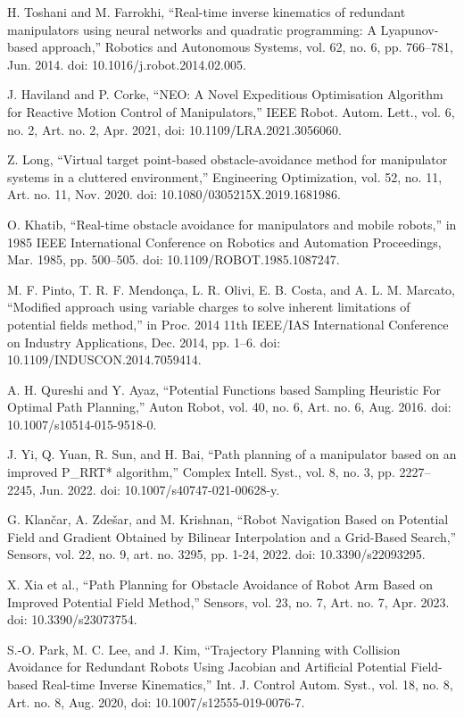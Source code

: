 \documentclass[letterpaper, 10 pt, conference]{ieeeconf}  %
\begin{document}
\begin{thebibliography}{99}
 H. Toshani and M. Farrokhi, “Real-time inverse kinematics of redundant manipulators using neural networks and quadratic programming: A Lyapunov-based approach,” Robotics and Autonomous Systems, vol. 62, no. 6, pp. 766–781, Jun. 2014. doi: 10.1016/j.robot.2014.02.005.

 J. Haviland and P. Corke, “NEO: A Novel Expeditious Optimisation Algorithm for Reactive Motion Control of Manipulators,” IEEE Robot. Autom. Lett., vol. 6, no. 2, Art. no. 2, Apr. 2021, doi: 10.1109/LRA.2021.3056060.

 Z. Long, “Virtual target point-based obstacle-avoidance method for manipulator systems in a cluttered environment,” Engineering Optimization, vol. 52, no. 11, Art. no. 11, Nov. 2020. doi: 10.1080/0305215X.2019.1681986.

 O. Khatib, “Real-time obstacle avoidance for manipulators and mobile robots,” in 1985 IEEE International Conference on Robotics and Automation Proceedings, Mar. 1985, pp. 500–505. doi: 10.1109/ROBOT.1985.1087247.

 M. F. Pinto, T. R. F. Mendonça, L. R. Olivi, E. B. Costa, and A. L. M. Marcato, “Modified approach using variable charges to solve inherent limitations of potential fields method,” in Proc. 2014 11th IEEE/IAS International Conference on Industry Applications, Dec. 2014, pp. 1–6. doi: 10.1109/INDUSCON.2014.7059414.

 A. H. Qureshi and Y. Ayaz, “Potential Functions based Sampling Heuristic For Optimal Path Planning,” Auton Robot, vol. 40, no. 6, Art. no. 6, Aug. 2016. doi: 10.1007/s10514-015-9518-0.

 J. Yi, Q. Yuan, R. Sun, and H. Bai, “Path planning of a manipulator based on an improved P\_RRT* algorithm,” Complex Intell. Syst., vol. 8, no. 3, pp. 2227–2245, Jun. 2022. doi: 10.1007/s40747-021-00628-y.

G. Klančar, A. Zdešar, and M. Krishnan, “Robot Navigation Based on Potential Field and Gradient Obtained by Bilinear Interpolation and a Grid-Based Search,” Sensors, vol. 22, no. 9, art. no. 3295, pp. 1-24, 2022. doi: 10.3390/s22093295.

 X. Xia et al., “Path Planning for Obstacle Avoidance of Robot Arm Based on Improved Potential Field Method,” Sensors, vol. 23, no. 7, Art. no. 7, Apr. 2023. doi: 10.3390/s23073754.

 S.-O. Park, M. C. Lee, and J. Kim, “Trajectory Planning with Collision Avoidance for Redundant Robots Using Jacobian and Artificial Potential Field-based Real-time Inverse Kinematics,” Int. J. Control Autom. Syst., vol. 18, no. 8, Art. no. 8, Aug. 2020, doi: 10.1007/s12555-019-0076-7.


\end{thebibliography}
\end{document}
